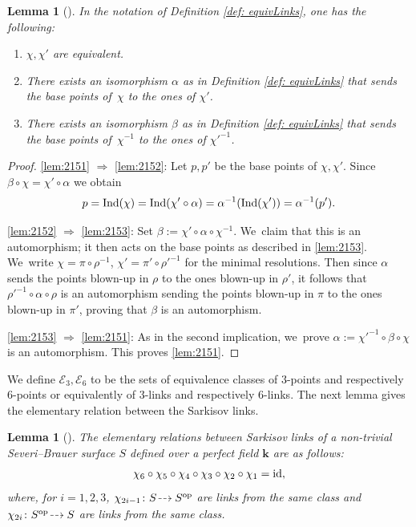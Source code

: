 \documentclass[JEP,XML,SOM,Unicode,NoFloatCountersInSection, NoEqCountersInSection,published]{cedram}
\newcommand{\dradpl}{{\hspace*{-2mm}\begin{tikzcd}[ampersand replacement=\&,column sep = scriptsize]\mbox{}\ar[r,dashed]\&\mbox{}\end{tikzcd}\hspace*{-2mm}}}
\newcommand{\dratst}{{\hspace*{-2.5mm}\begin{tikzcd}[ampersand replacement=\&,column sep = small]\mbox{}\ar[r,dashed]\&\mbox{}\end{tikzcd}\hspace*{-2mm}}}
\let\drascst\dratst
\newcommand{\dra}{\mathchoice{\dradpl}{\dratst}{\drascst}{\drascst}}
\newcommand{\id}{\textup{id}}
\newcommand{\Ind}{\textup{Ind}}
\newcommand{\op}{\textup{op}}
\newtheorem{lemma}[theorem]{Lemma}
\theoremstyle{definition}
\newcommand{\kk}{{\boldsymbol{k}}}
\begin{document}
\begin{lemma} [{\cite[Lem.\,3.3.2]{BSY}}]
In the notation of Definition \ref{def: equivLinks}, one has the following:
\begin{enumerate}
\item\label{lem:2151}
$\chi, \chi'$ are equivalent.

\item\label{lem:2152}
There exists an isomorphism $\alpha$ as in Definition \ref{def: equivLinks} that sends the base points of~$\chi$ to the ones of $\chi'$.

\item\label{lem:2153}
There exists an isomorphism $\beta$ as in Definition \ref{def: equivLinks} that sends the base points of~$\chi^{-1}$ to the ones of $\chi'^{-1}$.
\end{enumerate}
\end{lemma}

\skpt
\begin{proof}
\eqref{lem:2151} $\Rightarrow$ \eqref{lem:2152}: Let $p,p'$ be the base points of $\chi,\chi'$. Since $\beta \circ \chi = \chi' \circ \alpha$ we obtain
\[
p=\Ind(\chi) = \Ind(\chi' \circ \alpha) = \alpha^{-1}(\Ind(\chi')) = \alpha^{-1}(p').
\]

\eqref{lem:2152} $\Rightarrow$ \eqref{lem:2153}: Set $\beta := \chi' \circ \alpha \circ \chi^{-1}$. We~claim that this is an automorphism; it then acts on the base points as described in \eqref{lem:2153}. We~write $\chi = \pi \circ \rho^{-1}$, $\chi' = \pi' \circ \rho'^{-1}$ for the minimal resolutions. Then since $\alpha$ sends the points blown-up in $\rho$ to the ones blown-up in $\rho'$, it follows that $\rho'^{-1} \circ \alpha \circ \rho$ is an automorphism sending the points blown-up in $\pi$ to the ones blown-up in $\pi'$, proving that $\beta$ is an automorphism.

\eqref{lem:2153} $\Rightarrow$ \eqref{lem:2151}: As in the second implication, we~prove $\alpha := \chi'^{-1} \circ \beta \circ \chi$ is an automorphism. This proves \eqref{lem:2151}.
\end{proof}

We define $\mathcal{E}_3, \mathcal{E}_6$ to be the sets of equivalence classes of $3$\nobreakdash-points and respectively $6$\nobreakdash-points or equivalently of $3$\nobreakdash-links and respectively $6$\nobreakdash-links. The next lemma gives the elementary relation between the Sarkisov links.

\begin{lemma}[{\cite[Lem.\,3.3.4]{BSY}}] \label{ElRel}
The elementary relations between Sarkisov links of a non-trivial Severi--Brauer surface $S$ defined over a perfect field $\kk$ are as follows:
\[
\chi_6 \circ \chi_5 \circ \chi_4 \circ \chi_3 \circ \chi_2 \circ \chi_1 = \id,
\]
where, for $i=1,2,3$, $\chi_{2i -1}\colon S \dra S^{\op}$ are links from the same class and $\chi_{2i}\colon S^{\op} \dra S$ are links from the same class.
\end{lemma}
\end{document}
